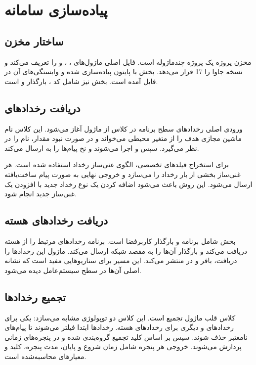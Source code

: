 \chapter{پیاده‌سازی سامانه}

\section{ساختار مخزن}
مخزن پروژه یک پروژه چندماژوله است. فایل اصلی  ماژول‌های ، ،  و  را تعریف می‌کند و نسخه جاوا را 17 قرار می‌دهد. بخش  با پایتون پیاده‌سازی شده و وابستگی‌های آن در فایل  آمده است. بخش  نیز شامل کد ، بارگذار  و  است.

\section{دریافت رخدادهای }
ورودی اصلی رخدادهای سطح برنامه در کلاس  از ماژول  آغاز می‌شود. این کلاس نام ماشین مجازی هدف را از متغیر محیطی  می‌خواند و در صورت نبود مقدار، نام  را در نظر می‌گیرد. سپس  و  اجرا می‌شوند و نخ  پیام‌ها را به  ارسال می‌کند.

برای استخراج فیلدهای تخصصی، الگوی غنی‌ساز رخداد استفاده شده است. هر غنی‌ساز بخشی از بار رخداد را می‌سازد و خروجی نهایی به صورت پیام ساخت‌یافته ارسال می‌شود. این روش باعث می‌شود اضافه کردن یک نوع رخداد جدید با افزودن یک غنی‌ساز جدید انجام شود.

\section{دریافت رخدادهای هسته}
بخش  شامل برنامه  و بارگذار کاربرفضا است. برنامه  رخدادهای مرتبط را از هسته دریافت می‌کند و بارگذار آن‌ها را به مقصد شبکه ارسال می‌کند. ماژول  این رخدادها را دریافت، بافر و در  منتشر می‌کند. این مسیر برای سناریوهایی مفید است که نشانه اصلی آن‌ها در سطح سیستم‌عامل دیده می‌شود.

\section{تجمیع رخدادها}
کلاس  قلب ماژول تجمیع است. این کلاس دو توپولوژی مشابه می‌سازد: یکی برای رخدادهای  و دیگری برای رخدادهای هسته. رخدادها ابتدا فیلتر می‌شوند تا پیام‌های نامعتبر حذف شوند. سپس بر اساس کلید تجمیع گروه‌بندی شده و در پنجره‌های زمانی پردازش می‌شوند. خروجی هر پنجره شامل زمان شروع و پایان، مدت پنجره، کلید و معیارهای محاسبه‌شده است.

